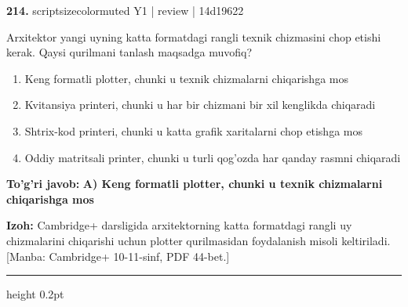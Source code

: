 \documentclass[10pt,a4paper]{article}
\begin{document}
{\bfseries\sffamily\color{ink} 214.} {scriptsizecolor{muted} Y1 | review | 14d19622}
\par
Arxitektor yangi uyning katta formatdagi rangli texnik chizmasini chop etishi kerak. Qaysi qurilmani tanlash maqsadga muvofiq?
\begin{enumerate}[label=\Alph*),leftmargin=9mm]
\item Keng formatli plotter, chunki u texnik chizmalarni chiqarishga mos
\item Kvitansiya printeri, chunki u har bir chizmani bir xil kenglikda chiqaradi
\item Shtrix-kod printeri, chunki u katta grafik xaritalarni chop etishga mos
\item Oddiy matritsali printer, chunki u turli qog'ozda har qanday rasmni chiqaradi
\end{enumerate}
\begin{tcolorbox}[enhanced,breakable,colback=teal!4,colframe=teal!60!black,boxrule=0.45pt,arc=1.2mm,left=2.7mm,right=2.7mm,top=1.8mm,bottom=1.8mm,before skip=2mm,after skip=2mm]
{\bfseries\sffamily\color{teal}To'g'ri javob:} \textbf{A) Keng formatli plotter, chunki u texnik chizmalarni chiqarishga mos}
\par\smallskip
{\bfseries Izoh:} Cambridge+ darsligida arxitektorning katta formatdagi rangli uy chizmalarini chiqarishi uchun plotter qurilmasidan foydalanish misoli keltiriladi. [Manba: Cambridge+ 10-11-sinf, PDF 44-bet.]
\end{tcolorbox}
\vspace{2mm}\hrule height 0.2pt\vspace{3mm}
\end{document}
